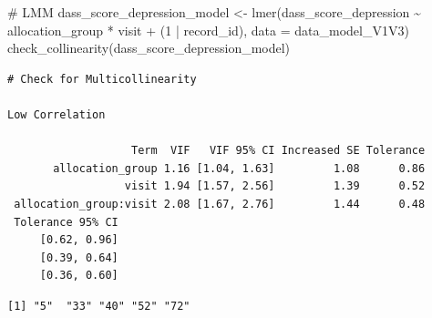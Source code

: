 \documentclass[
  letterpaper,
  DIV=11,
  numbers=noendperiod]{scrartcl}
\newenvironment{Shaded}{\begin{snugshade}}{\end{snugshade}}
\newcommand{\AttributeTok}[1]{\textcolor[rgb]{0.40,0.45,0.13}{#1}}
\newcommand{\CommentTok}[1]{\textcolor[rgb]{0.37,0.37,0.37}{#1}}
\newcommand{\DecValTok}[1]{\textcolor[rgb]{0.68,0.00,0.00}{#1}}
\newcommand{\FunctionTok}[1]{\textcolor[rgb]{0.28,0.35,0.67}{#1}}
\newcommand{\NormalTok}[1]{\textcolor[rgb]{0.00,0.23,0.31}{#1}}
\newcommand{\OtherTok}[1]{\textcolor[rgb]{0.00,0.23,0.31}{#1}}
\newcommand{\SpecialCharTok}[1]{\textcolor[rgb]{0.37,0.37,0.37}{#1}}
\newcommand{\StringTok}[1]{\textcolor[rgb]{0.13,0.47,0.30}{#1}}
\begin{document}
\begin{Shaded}
\begin{Highlighting}[]
\CommentTok{\# LMM}
\NormalTok{dass\_score\_depression\_model }\OtherTok{\textless{}{-}} \FunctionTok{lmer}\NormalTok{(dass\_score\_depression }\SpecialCharTok{\textasciitilde{}}\NormalTok{ allocation\_group }\SpecialCharTok{*}\NormalTok{ visit }\SpecialCharTok{+}\NormalTok{ (}\DecValTok{1} \SpecialCharTok{|}\NormalTok{ record\_id), }\AttributeTok{data =}\NormalTok{ data\_model\_V1V3)}
\FunctionTok{check\_collinearity}\NormalTok{(dass\_score\_depression\_model)}
\end{Highlighting}
\end{Shaded}

\begin{verbatim}
# Check for Multicollinearity

Low Correlation

                   Term  VIF   VIF 95% CI Increased SE Tolerance
       allocation_group 1.16 [1.04, 1.63]         1.08      0.86
                  visit 1.94 [1.57, 2.56]         1.39      0.52
 allocation_group:visit 2.08 [1.67, 2.76]         1.44      0.48
 Tolerance 95% CI
     [0.62, 0.96]
     [0.39, 0.64]
     [0.36, 0.60]
\end{verbatim}

\begin{Shaded}
\end{Shaded}

\begin{verbatim}
[1] "5"  "33" "40" "52" "72"
\end{verbatim}
\end{document}

